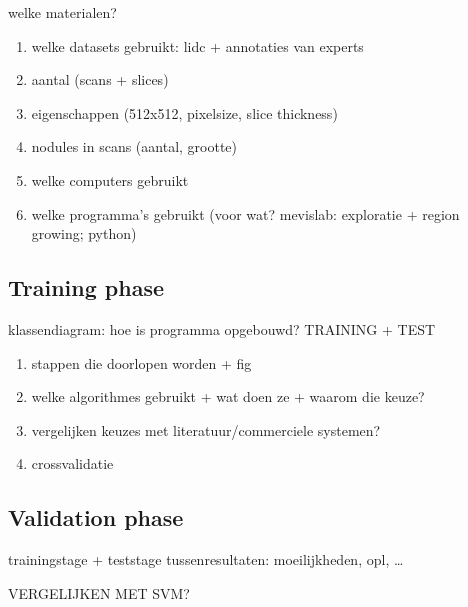 welke materialen?
\begin{enumerate}
\item welke datasets gebruikt: lidc + annotaties van experts
\item aantal (scans + slices)
\item eigenschappen (512x512, pixelsize, slice thickness)
\item nodules in scans (aantal, grootte)
\item welke computers gebruikt
\item welke programma's gebruikt (voor wat? mevislab: exploratie + region
growing; python)
\end{enumerate}

\subsection{Training phase}

klassendiagram: hoe is programma opgebouwd?
TRAINING + TEST
\begin{enumerate}
\item stappen die doorlopen worden + fig
\item welke algorithmes gebruikt + wat doen ze + waarom die keuze?
\item vergelijken keuzes met literatuur/commerciele systemen?
\item crossvalidatie
\end{enumerate}

\subsection{Validation phase}

trainingstage + teststage
tussenresultaten: moeilijkheden, opl, \ldots


VERGELIJKEN MET SVM?
